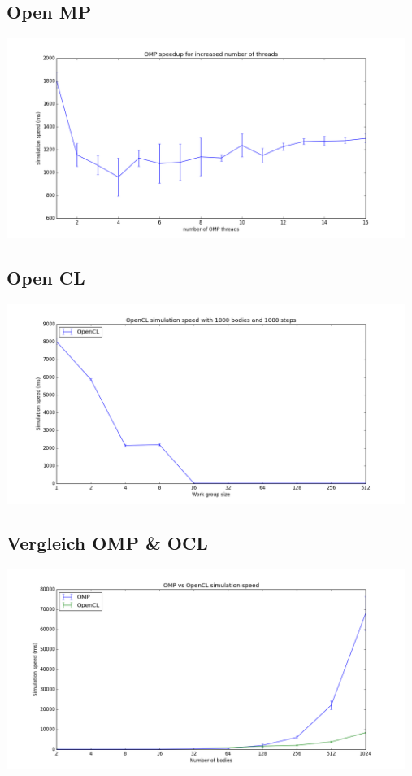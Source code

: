 \documentclass{beamer}
\begin{document}
\subsection{Open MP}
\begin{frame}
\includegraphics[width=13cm]{img/omp_1000b_1000s_10r.png}
\end{frame}

\subsection{Open CL}
\begin{frame}
\includegraphics[width=13cm]{img/ocl_1000b_1000s_10r.png}
\end{frame}

\subsection{Vergleich OMP \& OCL}
\begin{frame}
\includegraphics[width=13cm]{img/omp_and_ocl.png}
\end{frame}
\end{document}
